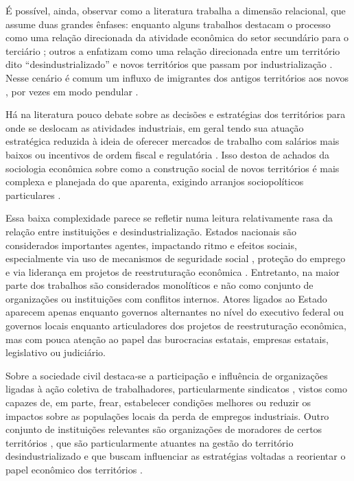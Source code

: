 É possível, ainda, observar como a literatura trabalha a dimensão
relacional, que assume duas grandes ênfases: enquanto alguns trabalhos
destacam o processo como uma relação direcionada da atividade econômica
do setor secundário para o terciário
\citep{beatty_long_2020,clark_voices_2020,clarke_closing_2015,kollmeyer_trade_2018,phillips_deindustrialization_2019,tomlinson_-industrialization_2016,tomlinson_-industrialization_2020,winant_hard_2019}; outros
a enfatizam como uma relação direcionada entre um território dito
``desindustrializado'' e novos territórios que passam por
industrialização
\citep{clarke_closing_2015,hodson_titanic_2019,kollmeyer_trade_2018,strangleman_deindustrialisation_2017,tomlinson_-industrialization_2020}. Nesse
cenário é comum um influxo de imigrantes dos antigos territórios aos
novos \citep{scheiring_deindustrialization_2023,winant_hard_2019}, por vezes em modo pendular
\citep[p.~43]{clark_voices_2020}.

Há na literatura pouco debate sobre as decisões e estratégias dos
territórios para onde se deslocam as atividades industriais, em geral
tendo sua atuação estratégica reduzida à ideia de oferecer mercados de
trabalho com salários mais baixos ou incentivos de ordem fiscal e
regulatória
\citep[p.~474]{strangleman_deindustrialisation_2017}. Isso destoa de achados da sociologia econômica sobre como a
construção social de novos territórios é mais complexa e planejada do
que aparenta, exigindo arranjos sociopolíticos particulares
\citep{santos_o_2007}.

Essa baixa complexidade parece se refletir numa leitura relativamente
rasa da relação entre instituições e desindustrialização. Estados
nacionais são considerados importantes agentes, impactando ritmo e
efeitos sociais, especialmente via uso de mecanismos de seguridade
social \citep{tomlinson_-industrialization_2016}, proteção do emprego
\citep{phillips_closure_2015,phillips_deindustrialization_2019} e via liderança em projetos de
reestruturação econômica
\citep{berger_burdens_2017}. Entretanto, na maior parte dos trabalhos são
considerados monolíticos e não como conjunto de organizações ou
instituições com conflitos internos. Atores ligados ao Estado aparecem
apenas enquanto governos alternantes no nível do executivo federal ou
governos locais enquanto articuladores dos projetos de reestruturação
econômica, mas com pouca atenção ao papel das burocracias estatais,
empresas estatais, legislativo ou judiciário.

Sobre a sociedade civil destaca-se a participação e influência de
organizações ligadas à ação coletiva de trabalhadores, particularmente
sindicatos \citep{hodson_titanic_2019,kollmeyer_trade_2018,phillips_closure_2015,phillips_deindustrialization_2019}, vistos como capazes de, em parte, frear, estabelecer condições
melhores ou reduzir os impactos sobre as populações locais da perda de
empregos industriais. Outro conjunto de instituições relevantes são
organizações de moradores de certos territórios
\citep{nettleingham_beyond_2019},
que são particularmente atuantes na gestão do território
desindustrializado e que buscam influenciar as estratégias voltadas a
reorientar o papel econômico dos territórios
\citep{hodson_titanic_2019,lewis_regenerating_2016}.

